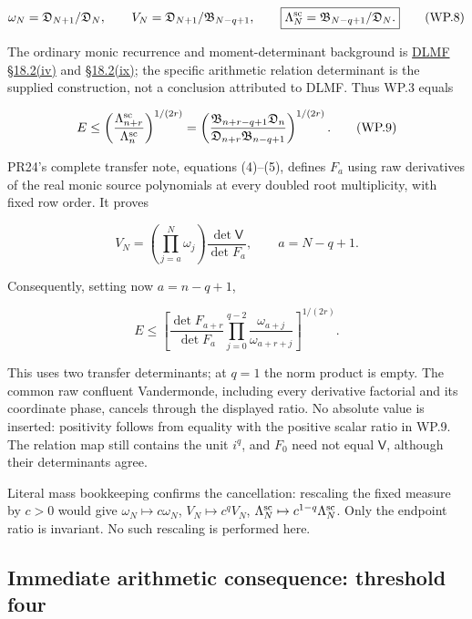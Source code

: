\[
\omega_N=\mathfrak D_{N+1}/\mathfrak D_N,\qquad
V_N=\mathfrak D_{N+1}/\mathfrak B_{N-q+1},\qquad
\boxed{\Lambda_N^{\rm sc}=\mathfrak B_{N-q+1}/\mathfrak D_N.} \tag{WP.8}
\]

The ordinary monic recurrence and moment-determinant background is \href{https://dlmf.nist.gov/18.2.iv}{DLMF §18.2(iv)} and \href{https://dlmf.nist.gov/18.2.ix}{§18.2(ix)}; the specific arithmetic relation determinant is the supplied construction, not a conclusion attributed to DLMF. Thus WP.3 equals

\[
E\le\left(\frac{\Lambda_{n+r}^{\rm sc}}{\Lambda_n^{\rm sc}}\right)^{1/(2r)}
=\left(\frac{\mathfrak B_{n+r-q+1}\mathfrak D_n}
{\mathfrak D_{n+r}\mathfrak B_{n-q+1}}\right)^{1/(2r)}. \tag{WP.9}
\]

PR24's complete transfer note, equations (4)--(5), defines \(F_a\) using raw derivatives of the real monic source polynomials at every doubled root multiplicity, with fixed row order. It proves

\[
V_N=\left(\prod_{j=a}^{N}\omega_j\right)\frac{\det\mathsf V}{\det F_a},
\qquad a=N-q+1.
\]

Consequently, setting now \(a=n-q+1\),

\[
\boxed{E\le\left[
\frac{\det F_{a+r}}{\det F_a}
\prod_{j=0}^{q-2}\frac{\omega_{a+j}}{\omega_{a+r+j}}
\right]^{1/(2r)}.} \tag{WP.10}
\]

This uses two transfer determinants; at \(q=1\) the norm product is empty. The common raw confluent Vandermonde, including every derivative factorial and its coordinate phase, cancels through the displayed ratio. No absolute value is inserted: positivity follows from equality with the positive scalar ratio in WP.9. The relation map still contains the unit \(i^q\), and \(F_0\) need not equal \(\mathsf V\), although their determinants agree.

Literal mass bookkeeping confirms the cancellation: rescaling the fixed measure by \(c>0\) would give \(\omega_N\mapsto c\omega_N\), \(V_N\mapsto c^qV_N\), \(\Lambda_N^{\rm sc}\mapsto c^{1-q}\Lambda_N^{\rm sc}\). Only the endpoint ratio is invariant. No such rescaling is performed here.

\subsection[\hspace{0.4em}Immediate arithmetic consequence: threshold four]{Immediate arithmetic consequence: threshold four}\label{window-product-immediate-arithmetic-consequence-threshold-four}


